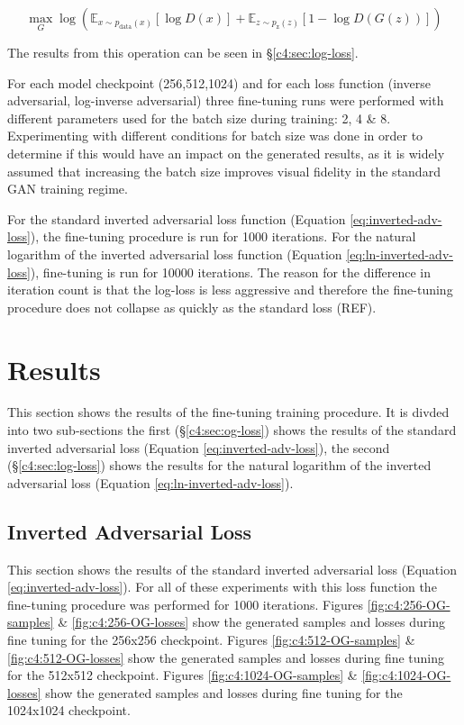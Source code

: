 \begin{equation} 
  \max_{G}\log(\mathbb{E}_{x\sim p_{\text{data}}(x)}[\log{D(x)}] +  \mathbb{E}_{z\sim p_{\text{z}}(z)}[1 - \log{D(G(z))}])
  \label{eq:ln-inverted-adv-loss}
  \end{equation}

The results from this operation can be seen in \S \ref{c4:sec:log-loss}.

For each model checkpoint (256,512,1024) and for each loss function (inverse adversarial, log-inverse adversarial) three fine-tuning runs were performed with different parameters used for the batch size during training: 2, 4 \& 8.
Experimenting with different conditions for batch size was done in order to determine if this would have an impact on the generated results, as it is widely assumed that increasing the batch size improves visual fidelity in the standard GAN training regime. 

For the standard inverted adversarial loss function (Equation \ref{eq:inverted-adv-loss}), the fine-tuning procedure is run for 1000 iterations.
For the natural logarithm of the inverted adversarial loss function (Equation \ref{eq:ln-inverted-adv-loss}), fine-tuning is run for 10000 iterations.
The reason for the difference in iteration count is that the log-loss is less aggressive and therefore the fine-tuning procedure does not collapse as quickly as the standard loss (REF).

\section{Results}
\label{c4:sec:results}

This section shows the results of the fine-tuning training procedure. 
It is divded into two sub-sections the first (\S \ref{c4:sec:og-loss}) shows the results of the standard inverted adversarial loss (Equation \ref{eq:inverted-adv-loss}), the second (\S \ref{c4:sec:log-loss}) shows the results for the natural logarithm of the inverted adversarial loss (Equation \ref{eq:ln-inverted-adv-loss}).

\subsection{Inverted Adversarial Loss}
\FloatBarrier

This section shows the results of the standard inverted adversarial loss (Equation \ref{eq:inverted-adv-loss}). For all of these experiments with this loss function the fine-tuning procedure was performed for 1000 iterations.
Figures \ref{fig:c4:256-OG-samples} \& \ref{fig:c4:256-OG-losses} show the generated samples and losses during fine tuning for the 256x256 checkpoint.
Figures \ref{fig:c4:512-OG-samples} \& \ref{fig:c4:512-OG-losses} show the generated samples and losses during fine tuning for the 512x512 checkpoint.
Figures \ref{fig:c4:1024-OG-samples} \& \ref{fig:c4:1024-OG-losses} show the generated samples and losses during fine tuning for the 1024x1024 checkpoint.

